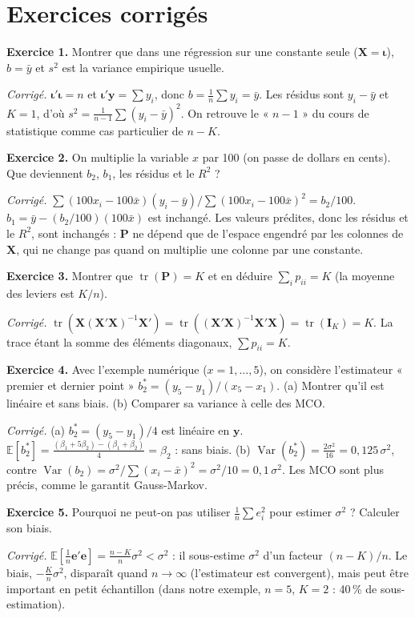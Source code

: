 \documentclass[11pt,a4paper]{article}
\newcommand{\vy}{\mathbf{y}}
\newcommand{\vX}{\mathbf{X}}
\newcommand{\ve}{\mathbf{e}}
\newcommand{\vi}{\bm{\iota}}
\newcommand{\Pm}{\mathbf{P}}
\newcommand{\I}{\mathbf{I}}
\newcommand{\XtX}{\vX'\vX}
\newcommand{\XtXi}{(\vX'\vX)^{-1}}
\newcommand{\E}{\mathbb{E}}
\newcommand{\Var}{\operatorname{Var}}
\newcommand{\tr}{\operatorname{tr}}
\begin{document}
\section{Exercices corrigés}

\textbf{Exercice 1.} Montrer que dans une régression sur une constante seule ($\vX=\vi$), $b=\bar y$ et $s^2$ est la variance empirique usuelle.

\emph{Corrigé.} $\vi'\vi=n$ et $\vi'\vy=\sum y_i$, donc $b=\frac1n\sum y_i=\bar y$. Les résidus sont $y_i-\bar y$ et $K=1$, d'où $s^2=\frac{1}{n-1}\sum(y_i-\bar y)^2$. On retrouve le « $n-1$ » du cours de statistique comme cas particulier de $n-K$.

\medskip
\textbf{Exercice 2.} On multiplie la variable $x$ par 100 (on passe de dollars en cents). Que deviennent $b_2$, $b_1$, les résidus et le $R^2$ ?

\emph{Corrigé.} $\sum(100x_i-100\bar x)(y_i-\bar y)/\sum(100x_i-100\bar x)^2=b_2/100$. $b_1=\bar y-(b_2/100)(100\bar x)$ est inchangé. Les valeurs prédites, donc les résidus et le $R^2$, sont inchangés : $\Pm$ ne dépend que de l'espace engendré par les colonnes de $\vX$, qui ne change pas quand on multiplie une colonne par une constante.

\medskip
\textbf{Exercice 3.} Montrer que $\tr(\Pm)=K$ et en déduire $\sum_i p_{ii}=K$ (la moyenne des leviers est $K/n$).

\emph{Corrigé.} $\tr(\vX\XtXi\vX')=\tr(\XtXi\XtX)=\tr(\I_K)=K$. La trace étant la somme des éléments diagonaux, $\sum p_{ii}=K$.

\medskip
\textbf{Exercice 4.} Avec l'exemple numérique ($x=1,\dots,5$), on considère l'estimateur « premier et dernier point » $b_2^*=(y_5-y_1)/(x_5-x_1)$. (a) Montrer qu'il est linéaire et sans biais. (b) Comparer sa variance à celle des MCO.

\emph{Corrigé.} (a) $b_2^*=(y_5-y_1)/4$ est linéaire en $\vy$. $\E[b_2^*]=\frac{(\beta_1+5\beta_2)-(\beta_1+\beta_2)}{4}=\beta_2$ : sans biais. (b) $\Var(b_2^*)=\frac{2\sigma^2}{16}=0{,}125\,\sigma^2$, contre $\Var(b_2)=\sigma^2/\sum(x_i-\bar x)^2=\sigma^2/10=0{,}1\,\sigma^2$. Les MCO sont plus précis, comme le garantit Gauss-Markov.

\medskip
\textbf{Exercice 5.} Pourquoi ne peut-on pas utiliser $\frac1n\sum e_i^2$ pour estimer $\sigma^2$ ? Calculer son biais.

\emph{Corrigé.} $\E[\frac1n\ve'\ve]=\frac{n-K}{n}\sigma^2<\sigma^2$ : il sous-estime $\sigma^2$ d'un facteur $(n-K)/n$. Le biais, $-\frac Kn\sigma^2$, disparaît quand $n\to\infty$ (l'estimateur est convergent), mais peut être important en petit échantillon (dans notre exemple, $n=5$, $K=2$ : 40\,\% de sous-estimation).
\end{document}
